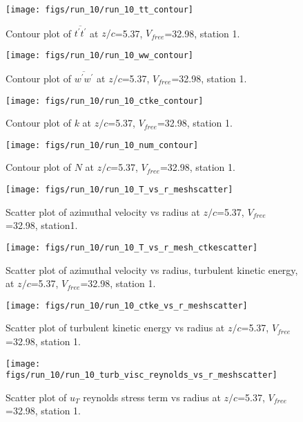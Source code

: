 \begin{figure}[H]
\centering
\texttt{[image: figs/run\_10/run\_10\_tt\_contour]}
\caption{Contour plot of $\overline{t^\prime t^\prime}$ at $z/c$=5.37, $V_{free}$=32.98, station 1.}
\end{figure}


\begin{figure}[H]
\centering
\texttt{[image: figs/run\_10/run\_10\_ww\_contour]}
\caption{Contour plot of $\overline{w^\prime w^\prime}$ at $z/c$=5.37, $V_{free}$=32.98, station 1.}
\end{figure}


\begin{figure}[H]
\centering
\texttt{[image: figs/run\_10/run\_10\_ctke\_contour]}
\caption{Contour plot of $k$ at $z/c$=5.37, $V_{free}$=32.98, station 1.}
\end{figure}


\begin{figure}[H]
\centering
\texttt{[image: figs/run\_10/run\_10\_num\_contour]}
\caption{Contour plot of $N$ at $z/c$=5.37, $V_{free}$=32.98, station 1.}
\end{figure}


\begin{figure}[H]
\centering
\texttt{[image: figs/run\_10/run\_10\_T\_vs\_r\_meshscatter]}
\caption{Scatter plot of azimuthal velocity vs radius at $z/c$=5.37, $V_{free}$=32.98, station1.}
\end{figure}


\begin{figure}[H]
\centering
\texttt{[image: figs/run\_10/run\_10\_T\_vs\_r\_mesh\_ctkescatter]}
\caption{Scatter plot of azimuthal velocity vs radius, turbulent kinetic energy, at $z/c$=5.37, $V_{free}$=32.98, station 1.}
\end{figure}


\begin{figure}[H]
\centering
\texttt{[image: figs/run\_10/run\_10\_ctke\_vs\_r\_meshscatter]}
\caption{Scatter plot of turbulent kinetic energy vs radius at $z/c$=5.37, $V_{free}$=32.98, station 1.}
\end{figure}


\begin{figure}[H]
\centering
\texttt{[image: figs/run\_10/run\_10\_turb\_visc\_reynolds\_vs\_r\_meshscatter]}
\caption{Scatter plot of $
u_T$ reynolds stress term vs radius at $z/c$=5.37, $V_{free}$=32.98, station 1.}
\end{figure}


